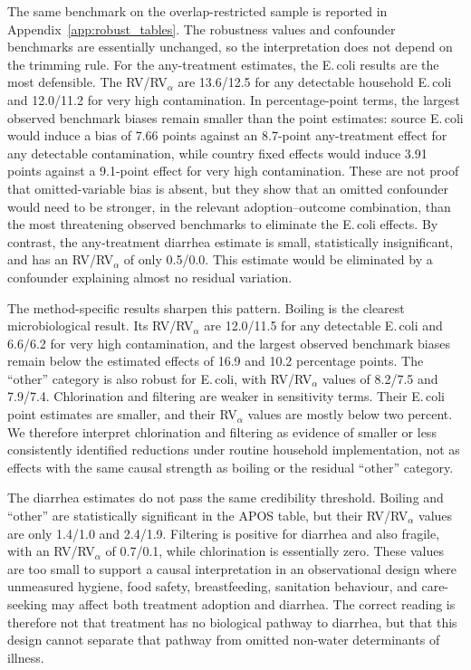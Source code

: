 \documentclass [11pt]{article}
\theoremstyle{plain}
\theoremstyle{definition}
\theoremstyle{remark}
\newcommand{\1}{\bm{1}}
\begin{document}


The same benchmark on the overlap-restricted sample is reported in Appendix~\ref{app:robust_tables}. The robustness values and confounder benchmarks are essentially unchanged, so the interpretation does not depend on the trimming rule. For the any-treatment estimates, the E.\,coli results are the most defensible. The RV/RV$_\alpha$ are 13.6/12.5 for any detectable household E.\,coli and 12.0/11.2 for very high contamination. In percentage-point terms, the largest observed benchmark biases remain smaller than the point estimates: source E.\,coli would induce a bias of 7.66 points against an 8.7-point any-treatment effect for any detectable contamination, while country fixed effects would induce 3.91 points against a 9.1-point effect for very high contamination. These are not proof that omitted-variable bias is absent, but they show that an omitted confounder would need to be stronger, in the relevant adoption--outcome combination, than the most threatening observed benchmarks to eliminate the E.\,coli effects. By contrast, the any-treatment diarrhea estimate is small, statistically insignificant, and has an RV/RV$_\alpha$ of only 0.5/0.0. This estimate would be eliminated by a confounder explaining almost no residual variation.

The method-specific results sharpen this pattern. Boiling is the clearest microbiological result. Its RV/RV$_\alpha$ are 12.0/11.5 for any detectable E.\,coli and 6.6/6.2 for very high contamination, and the largest observed benchmark biases remain below the estimated effects of 16.9 and 10.2 percentage points. The ``other'' category is also robust for E.\,coli, with RV/RV$_\alpha$ values of 8.2/7.5 and 7.9/7.4. Chlorination and filtering are weaker in sensitivity terms. Their E.\,coli point estimates are smaller, and their RV$_\alpha$ values are mostly below two percent. We therefore interpret chlorination and filtering as evidence of smaller or less consistently identified reductions under routine household implementation, not as effects with the same causal strength as boiling or the residual ``other'' category.

The diarrhea estimates do not pass the same credibility threshold. Boiling and ``other'' are statistically significant in the APOS table, but their RV/RV$_\alpha$ values are only 1.4/1.0 and 2.4/1.9. Filtering is positive for diarrhea and also fragile, with an RV/RV$_\alpha$ of 0.7/0.1, while chlorination is essentially zero. These values are too small to support a causal interpretation in an observational design where unmeasured hygiene, food safety, breastfeeding, sanitation behaviour, and care-seeking may affect both treatment adoption and diarrhea. The correct reading is therefore not that treatment has no biological pathway to diarrhea, but that this design cannot separate that pathway from omitted non-water determinants of illness.
\end{document}
